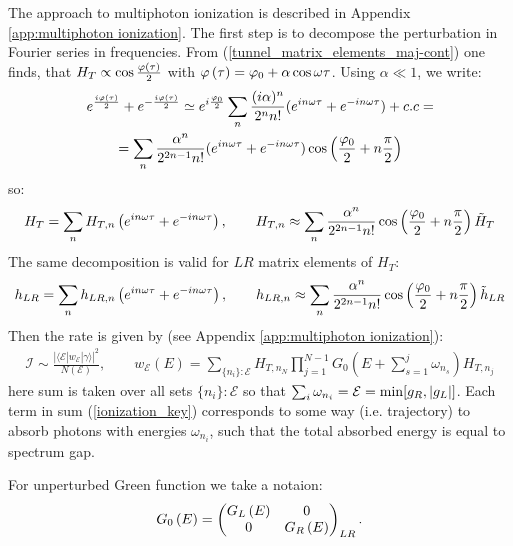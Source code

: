 The approach to multiphoton ionization is described in Appendix \ref{app:multiphoton ionization}.  The first step is to decompose the  perturbation in Fourier series in frequencies. From  (\ref{tunnel_matrix_elements_maj-cont}) one finds, that $ H_T\propto\cos\frac{\varphi\left(\tau\right)}{2} $ with $ \varphi\left(\tau\right)=\varphi_{0}+\alpha\cos\omega \tau $. Using $ \alpha\ll1 $, we write:
\begin{multline}
	e^{\frac{i\varphi\left(\tau\right)}{2}}+e^{-\frac{i\varphi\left(\tau\right)}{2}}\simeq e^{i\frac{\varphi_{0}}{2}}\sum_{n}\frac{(i\alpha)^{n}}{2^{n}n!}(e^{in\omega \tau}+e^{-in\omega \tau})+c.c=
	\\
	=\sum_{n}\frac{\alpha{}^{n}}{2^{2n-1}n!}(e^{in\omega \tau}+e^{-in\omega \tau})\cos\left(\frac{\varphi_{0}}{2}+n\frac{\pi}{2}\right)
\end{multline}
so:
\begin{gather}
	H_{T}=
	\sum_n
	H_{T,n}
	\left(
	e^{in\omega\tau }
	+
	e^{-in\omega\tau }
	\right),
	\qquad
	H_{T,n}
	\approx
	\sum_{n}	
	\frac
	{\alpha^{n}}
	{2^{2n-1}n!}
	\cos\left(\frac{\varphi_{0}}{2}+n\frac{\pi}{2}\right)
	\tilde{H}_{T}
\end{gather}
The same decomposition is valid for $ LR $ matrix elements of $ H_T $:
\begin{gather}
h_{LR}=
\sum_n
h_{LR,n}
\left(
	e^{in\omega\tau }
	+
	e^{-in\omega\tau }
\right),
\qquad
h_{LR,n}
\approx
\sum_{n}	
\frac
{\alpha^{n}}
{2^{2n-1}n!}
\cos\left(\frac{\varphi_{0}}{2}+n\frac{\pi}{2}\right)
\tilde{h}_{LR}
\end{gather}
Then the rate is given by (see Appendix \ref{app:multiphoton ionization}):
\begin{gather}
\label{ionization_key}
\mathcal{I}
\sim
\frac{|\langle\mathcal{E}|w_{\mathcal{E}}|\gamma\rangle|^{2}}{N(\mathcal{E})},
\qquad
w_{\mathcal{E}}(E)
=
\sum_{\{n_{i}\}:\mathcal{E}}H_{T,n_{N}}\prod_{j=1}^{N-1}G_{0}\left(E+\sum_{s=1}^{j}\omega_{n_{s}}\right)H_{T,n_{j}}
\end{gather}
here sum is taken over all sets $ \{n_i\}:\mathcal{E} $ so that $ \sum_{i} \omega_{n_i}=\mathcal{E}=\min[g_R, \left|g_L\right|]$. Each term in sum (\ref{ionization_key}) corresponds to some way (i.e. trajectory) to absorb photons with energies $ \omega_{n_i} $, such that the total absorbed energy is equal to spectrum gap.

For unperturbed Green function we take a notaion:
\begin{gather}
	G_0\left(E\right)
	=
	\begin{pmatrix}
	G_L\left(E\right) & 0 \\
	0 & G_R\left(E\right)
	\end{pmatrix}_{LR}.
\end{gather}

